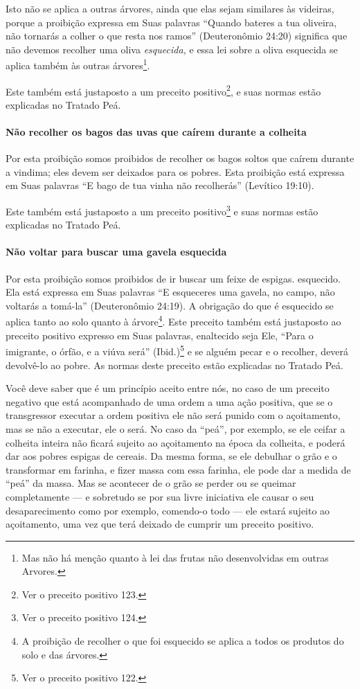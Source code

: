 Isto não se aplica a outras árvores, ainda que elas sejam similares às
videiras, porque a proibição expressa em Suas palavras ``Quando bateres
a tua oliveira, não tornarás a colher o que resta nos ramos''
(Deuteronômio 24:20) significa que não devemos recolher uma oliva
\emph{esquecida,} e essa lei sobre a oliva esquecida se aplica também
às outras árvores\footnote{Mas não há menção quanto à lei das frutas não desenvolvidas em outras
  Arvores.}.

Este também está justaposto a um preceito
positivo\footnote{Ver o preceito positivo 123.}, e suas normas estão explicadas no
Tratado Peá.

\paragraph{Não recolher os bagos das uvas que caírem durante a colheita}

Por esta proibição somos proibidos de recolher os bagos soltos que
caírem durante a vindima; eles devem ser deixados para os pobres. Esta
proibição está expressa em Suas palavras ``E bago de tua vinha não
recolherás'' (Levítico 19:10).

Este também está justaposto a um preceito positivo\footnote{Ver o preceito positivo 124.}
e suas normas estão explicadas no Tratado Peá.

\paragraph{Não voltar para buscar uma gavela esquecida}

Por esta proibição somos proibidos de ir buscar um feixe de espigas.
esquecido. Ela está expressa em Suas palavras ``E esqueceres uma gavela,
no campo, não voltarás a tomá-la'' (Deuteronômio 24:19). A obrigação do
que é esquecido se aplica tanto ao solo quanto à
árvore\footnote{A proibição de recolher o que foi esquecido se aplica a todos os
  produtos do solo e das árvores.}. Este preceito também está justaposto ao
preceito positivo expresso em Suas palavras, enaltecido seja Ele, ``Para
o imigrante, o órfão, e a viúva será'' (Ibid.)\footnote{Ver o preceito positivo 122.} e
se alguém pecar e o recolher, deverá devolvê-lo ao pobre. As normas
deste preceito estão explicadas no Tratado Peá.

Você deve saber que é um princípio aceito entre nós, no caso de um
preceito negativo que está acompanhado de uma ordem a uma ação positiva,
que se o transgressor executar a ordem positiva ele não será punido com
o açoitamento, mas se não a executar, ele o será. No caso da ``peá'',
por exemplo, se ele ceifar a colheita inteira não ficará sujeito ao
açoitamento na época da colheita, e poderá dar aos pobres espigas de
cereais. Da mesma forma, se ele debulhar o grão e o transformar em
farinha, e fizer massa com essa farinha, ele pode dar a medida de
``peá'' da massa. Mas se acontecer de o grão se perder ou se queimar
completamente --- e sobretudo se por sua livre iniciativa ele causar o
seu desaparecimento como por exemplo, comendo-o
todo --- ele estará sujeito ao açoitamento, uma vez que terá deixado de
cumprir um preceito positivo.

